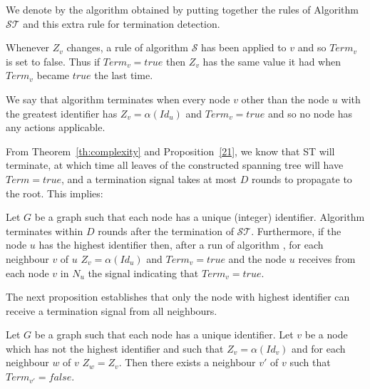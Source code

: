 \documentclass[11pt,envcountsame,letterpaper]{llncs}
\begin{document}
We denote by \STT
 the algorithm obtained  by putting  together the rules
 of Algorithm $\mathcal {ST}$ and this extra rule for termination detection.

Whenever $Z_v$ changes, a rule of algorithm $\mathcal {S}$ has been applied to $v$
 and so $Term_v$ is set to false. Thus
if $Term_v=true$  then $Z_v$ has the same value  it had when $Term_v$
became $true$ the last time.

We say that algorithm \STT terminates when every node $v$ other than the node $u$
with the greatest identifier has $Z_v=\alpha(Id_u)$ and $Term_v=true$ and so
no node has any actions applicable.

From Theorem~\ref{th:complexity} and Proposition~\ref{21}, we know that ST will terminate, at which time all leaves of the constructed spanning tree will have $Term = true$, and a termination signal takes at most $D$ rounds to propagate to the root. This implies:
\begin{proposition}
  \label{prop:STTterm}
Let $G$ be a graph such that each node has a unique (integer) identifier. 
Algorithm \STT terminates within $D$ rounds after the termination of $\mathcal{ST}$. Furthermore,
if the node $u$ has the highest identifier then,  after a run of 
algorithm \STT,  for each neighbour $v$ of 
$u$ $Z_v=\alpha(Id_u)$  and $Term_v=true$ and 
the node $u$ receives from each node $v$ in $N_u$ the signal 
indicating that $Term_v=true$.
\end{proposition}

The next proposition
establishes
that only the node with highest identifier
can receive a termination signal from all neighbours.

\begin{proposition}\label{prop:term}
Let $G$ be a graph such that each node has a unique identifier.
Let $v$ be a node which has not the highest identifier and 
such that $Z_v=\alpha(Id_v)$ and for each neighbour $w$ of $v$
$Z_w=Z_v$. Then there exists a neighbour $v'$ of $v$ such that 
$Term_{v'}=false$.
\end{proposition}
\end{document}
